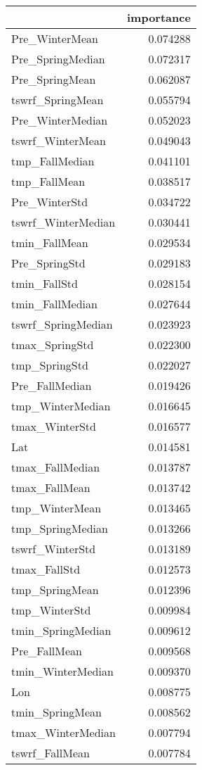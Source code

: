\begin{tabular}{lr}
\toprule
 & importance \\
\midrule
Pre_WinterMean & 0.074288 \\
Pre_SpringMedian & 0.072317 \\
Pre_SpringMean & 0.062087 \\
tswrf_SpringMean & 0.055794 \\
Pre_WinterMedian & 0.052023 \\
tswrf_WinterMean & 0.049043 \\
tmp_FallMedian & 0.041101 \\
tmp_FallMean & 0.038517 \\
Pre_WinterStd & 0.034722 \\
tswrf_WinterMedian & 0.030441 \\
tmin_FallMean & 0.029534 \\
Pre_SpringStd & 0.029183 \\
tmin_FallStd & 0.028154 \\
tmin_FallMedian & 0.027644 \\
tswrf_SpringMedian & 0.023923 \\
tmax_SpringStd & 0.022300 \\
tmp_SpringStd & 0.022027 \\
Pre_FallMedian & 0.019426 \\
tmp_WinterMedian & 0.016645 \\
tmax_WinterStd & 0.016577 \\
Lat & 0.014581 \\
tmax_FallMedian & 0.013787 \\
tmax_FallMean & 0.013742 \\
tmp_WinterMean & 0.013465 \\
tmp_SpringMedian & 0.013266 \\
tswrf_WinterStd & 0.013189 \\
tmax_FallStd & 0.012573 \\
tmp_SpringMean & 0.012396 \\
tmp_WinterStd & 0.009984 \\
tmin_SpringMedian & 0.009612 \\
Pre_FallMean & 0.009568 \\
tmin_WinterMedian & 0.009370 \\
Lon & 0.008775 \\
tmin_SpringMean & 0.008562 \\
tmax_WinterMedian & 0.007794 \\
tswrf_FallMean & 0.007784 \\

\end{tabular}
